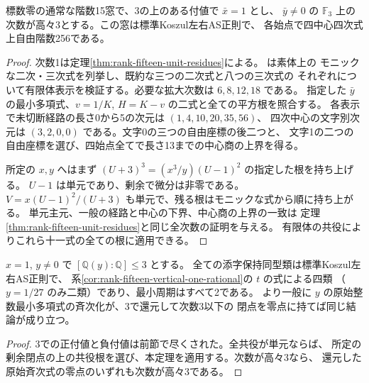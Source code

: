 \begin{theorem}\label{thm:rank-fifteen-vertical-unit-levels}
標数零の通常な階数15窓で、3の上のある付値で $\bar x=1$ とし、
$\bar y\ne0$ の $\mathbb F_3$ 上の次数が高々3とする。この窓は標準Koszul左右AS正則で、
各始点で四中心四次式上自由階数256である。
\end{theorem}
\begin{proof}
次数1は定理\ref{thm:rank-fifteen-unit-residues}による。
 は素体上の
モニックな二次・三次式を列挙し、既約な三つの二次式と八つの三次式の
それぞれについて有限体表示を検証する。必要な拡大次数は $6,8,12,18$ である。
指定した $\bar y$ の最小多項式、$v=1/K$, $H=K-v$ の二式と全ての平方根を照合する。
各表示で未切断経路の長さ0から5の次元は $(1,4,10,20,35,56)$、
四次中心の文字別次元は $(3,2,0,0)$ である。文字0の三つの自由座標の後二つと、
文字1の二つの自由座標を選び、四始点全てで長さ13までの中心商の上界を得る。

所定の $x,y$ へはまず $(U+3)^3=(x^3/y)(U-1)^2$ の指定した根を持ち上げる。
$U-1$ は単元であり、剰余で微分は非零である。
$V=x(U-1)^2/(U+3)$ も単元で、残る根はモニックな式から順に持ち上がる。
単元主元、一般の経路と中心の下界、中心商の上界の一致は
定理\ref{thm:rank-fifteen-unit-residues}と同じ全次数の証明を与える。
有限体の共役によりこれら十一式の全ての根に適用できる。
\end{proof}
\begin{corollary}
$x=1$, $y\ne0$ で $[\mathbb Q(y):\mathbb Q]\le3$ とする。
全ての添字保持同型類は標準Koszul左右AS正則で、
系\ref{cor:rank-fifteen-vertical-one-rational}の $t$ の式による四類
（$y=1/27$ のみ二類）であり、最小周期はすべて2である。
より一般に $y$ の原始整数最小多項式の斉次化が、3で還元して次数3以下の
閉点を零点に持てば同じ結論が成り立つ。
\end{corollary}
\begin{proof}
3での正付値と負付値は前節で尽くされた。全共役が単元ならば、
所定の剰余閉点の上の共役根を選び、本定理を適用する。次数が高々3なら、
還元した原始斉次式の零点のいずれも次数が高々3である。
\end{proof}
